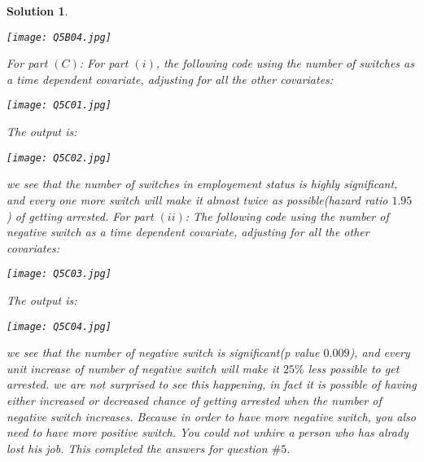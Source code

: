 \documentclass[11pt]{article}
\newtheorem{sol}{Solution}
\begin{document}
\begin{sol}
	\begin{center}
		\texttt{[image: Q5B04.jpg]}
	\end{center}
	For part $(C)$:\vskip 2mm
	For part $(i)$, \vskip 2mm
	the following code using the number of switches as a time dependent covariate, adjusting for all the other covariates:
	\begin{center}
		\texttt{[image: Q5C01.jpg]}
	\end{center}
	The output is:
	\begin{center}
		\texttt{[image: Q5C02.jpg]}
	\end{center}
	we see that the number of switches in employement status is highly significant, and every one more switch will make it almost twice as possible(hazard ratio $1.95$) of getting arrested.\vskip 2mm
	For part $(ii)$:\vskip 2mm
	The following code using the number of negative switch as a time dependent covariate, adjusting for all the other covariates:
	\begin{center}
		\texttt{[image: Q5C03.jpg]}
	\end{center}
	The output is:
	\begin{center}
		\texttt{[image: Q5C04.jpg]}
	\end{center}
	we see that the number of negative switch is significant(p value $0.009$), and every unit increase of number of negative switch will make it $25\%$ less possible to get arrested.\vskip 2mm
	we are not surprised to see this happening, in fact it is possible of having either increased or decreased chance of getting arrested when the number of negative switch increases. Because in order to have more negative switch, you also need to have more positive switch. You could not unhire a person who has alrady lost his job.\vskip 2mm
	This completed the answers for question $\#5$.
\end{sol}
\end{document}
